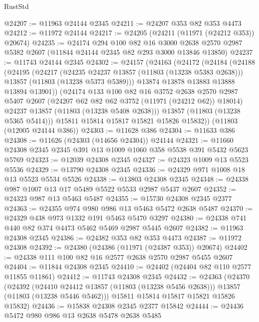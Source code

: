 \begin{lexlean}{RustStd}
\begin{coremodule}
@24207 := @11963 @24144 @2345
@24211 := @24207 @353 @82 @353 @4473
@24212 := @11972 @24144
@24217 := @24205 (@24211 (@11971 (@24212 @353)) @20674)
@24235 := @24174
    @294
    @100
    @82
    @16
    @3000
    @2638
    @2570
    @2987
    @5382
    @2607
    (@11844 @24144 @2345 @82 @293 @3000 @13846 @13850)
@24237 := @11743 @24144 @2345
@24302 := @24157
    (@24163
      (@24172
        (@24184
          (@24188
            (@24195
              (@24217
                (@24235 @24237 @13857 (@11803 (@13238 @5383 @2638)))
                @13857
                (@11803 (@13238 @5373 @5389)))
              @13874
              @13878
              @13883
              @13888
              @13894
              @13901))
          (@24174
            @133
            @100
            @82
            @16
            @3752
            @2638
            @2570
            @2987
            @5407
            @2607
            (@24207 @62 @82 @62 @3752 (@11971 (@24212 @62)) @18014)
            @24237
            @13857
            (@11803 (@13238 @5408 @2638)))
          @13857
          (@11803 (@13238 @5365 @5414)))
        @15811
        @15814
        @15817
        @15821
        @15826
        @15832))
    (@11803 (@12005 @24144 @386))
@24303 := @11628 @386
@24304 := @11633 @386
@24308 := @11626 (@24303 (@14656 @24304)) @24144
@24321 := @11660 @24308 @2345 @2345 @391 @13 @1009 @1060 @358 @5538 @391 @5432 @5623 @5769
@24323 := @12039 @24308 @2345
@24327 := @24323 @1009 @13 @5523 @5536
@24329 := @13790 @24308 @2345
@24336 := @24329 @971 @1008 @18 @13 @5523 @5534 @5526
@24338 := @13803 @24308 @2345
@24348 := @24338 @987 @1007 @13 @17 @5489 @5522 @5533 @2987 @5437 @2607
@24352 := @24323 @987 @13 @5463 @5487
@24355 := @15730 @24308 @2345 @2377
@24363 := @24355 @974 @980 @986 @13 @5463 @5472 @2638 @5487
@24370 := @24329 @438 @973 @1332 @191 @5463 @5470 @3297
@24380 := @24338 @741 @440 @82 @374 @4473 @5462 @5469 @2987 @5445 @2607
@24382 := @11963 @24308 @2345
@24386 := @24382 @353 @82 @353 @4473
@24387 := @11972 @24308
@24392 := @24380 (@24386 (@11971 (@24387 @353)) @20674)
@24402 := @24338 @111 @100 @82 @16 @2577 @2638 @2570 @2987 @5455 @2607
@24404 := @11844 @24308 @2345
@24410 := @24402 (@24404 @82 @110 @2577 @11855 @11861)
@24412 := @11743 @24308 @2345
@24432 := @24363
    (@24370
      (@24392
        (@24410 @24412 @13857 (@11803 (@13238 @5456 @2638)))
        @13857
        (@11803 (@13238 @5446 @5462)))
      @15811
      @15814
      @15817
      @15821
      @15826
      @15832)
@24436 := @15838 @24308 @2345 @2377 @15842
@24444 := @24436 @5472 @980 @986 @13 @2638 @5478 @2638 @5485

\end{coremodule}
\end{lexlean}
